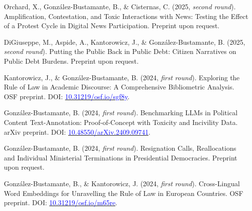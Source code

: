 \begin{publications}

\begin{benumerate}{6}

\item{Orchard, X., González-Bustamante, B., \& Cisternas, C. (2025, {\itshape second round}). Amplification, Contestation, and Toxic Interactions with News: Testing the Effect of a Protest Cycle in Digital News Participation. Preprint upon request.}\vspace{1mm}

\item{DiGiuseppe, M., Aspide, A., Kantorowicz, J., \& González-Bustamante, B. (2025, {\itshape second round}). Putting the Public Back in Public Debt: Citizen Narratives on Public Debt Burdens. Preprint upon request.}\vspace{1mm}

\item{Kantorowicz, J., \& González-Bustamante, B. (2024, {\itshape first round}). Exploring the Rule of Law in Academic Discourse: A Comprehensive Bibliometric Analysis. OSF preprint. DOI: \href{https://doi.org/10.31219/osf.io/sgf8y}{\textcolor{blue}{10.31219/osf.io/sgf8y}}.}\vspace{1mm}

\item{González-Bustamante, B. (2024, {\itshape first round}). Benchmarking LLMs in Political Content Text-Annotation: Proof-of-Concept with Toxicity and Incivility Data. arXiv preprint. DOI: \href{https://doi.org/10.48550/arXiv.2409.09741}{\textcolor{blue}{10.48550/arXiv.2409.09741}}.}\vspace{1mm}

\item{González-Bustamante, B. (2024, {\itshape first round}). Resignation Calls, Reallocations and Individual Ministerial Terminations in Presidential Democracies. Preprint upon request.}\vspace{1mm} %

\item{González-Bustamante, B., \& Kantorowicz, J. (2024, {\itshape first round}). Cross-Lingual Word Embeddings for Unravelling the Rule of Law in European Countries. OSF preprint. DOI: \href{https://doi.org/10.31219/osf.io/m65re}{\textcolor{blue}{10.31219/osf.io/m65re}}.}\vspace{1mm}


\end{benumerate}

\end{publications}

